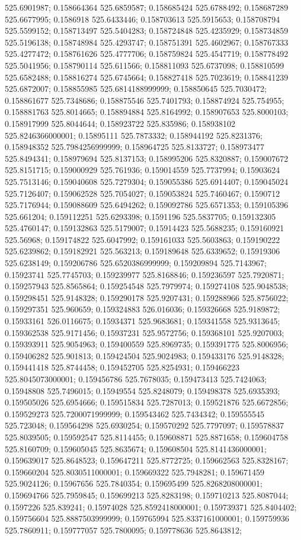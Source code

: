 525.6901987; 0.158664364 525.6859587; 0.158685424 525.6788492; 0.158687289 525.6677995; 0.1586918 525.6433446; 0.158703613 525.5915653; 0.158708794 525.5599152; 0.158713497 525.5404283; 0.158724848 525.4235929; 0.158734859 525.5196138; 0.158748984 525.4293747; 0.158751391 525.4602967; 0.158767333 525.4277472; 0.158761626 525.4777706; 0.158759824 525.4547719; 0.158778492 525.5041956; 0.158790114 525.611566; 0.158811093 525.6737098; 0.158810599 525.6582488; 0.158816274 525.6745664; 0.158827418 525.7023619; 0.158841239 525.6872007; 0.158855985 525.6814188999999; 0.158850645 525.7030472; 0.158861677 525.7348686; 0.158875546 525.7401793; 0.158874924 525.754955; 0.158881763 525.8014665; 0.158894884 525.8164992; 0.158907653 525.8000103; 0.158917999 525.8044644; 0.158923722 525.835986; 0.158938102 525.8246366000001; 0.15895111 525.7873332; 0.158944192 525.8231376; 0.158948352 525.7984256999999; 0.158964725 525.8133727; 0.158973477 525.8494341; 0.158979694 525.8137153; 0.158995206 525.8320887; 0.159007672 525.8151715; 0.159000929 525.761936; 0.159014559 525.7737994; 0.15903624 525.7513146; 0.159040608 525.7279304; 0.159055386 525.6914407; 0.159045024 525.7126407; 0.159062528 525.7054027; 0.159053824 525.7460467; 0.1590712 525.7176944; 0.159088609 525.6494262; 0.159092786 525.6571353; 0.159105396 525.661204; 0.159112251 525.6293398; 0.1591196 525.5837705; 0.159132305 525.4760147; 0.159132863 525.5179007; 0.15914423 525.5688235; 0.159160921 525.56968; 0.159174822 525.6047992; 0.159161033 525.5603863; 0.159190222 525.6239862; 0.159182921 525.563213; 0.159189648 525.6339652; 0.15919306 525.6238149; 0.159206786 525.6520386999999; 0.159209894 525.7143967; 0.15923741 525.7745703; 0.159239977 525.8168846; 0.159236597 525.7920871; 0.159257943 525.8565864; 0.159254548 525.7979974; 0.159274108 525.9048538; 0.159298451 525.9148328; 0.159290178 525.9207431; 0.159288966 525.8756022; 0.159297351 525.960659; 0.159324883 526.016036; 0.159326668 525.9189872; 0.15933161 526.0116675; 0.15934371 525.9683681; 0.159341558 525.9313645; 0.159362538 525.9171456; 0.15937231 525.9572756; 0.159368101 525.9207003; 0.159393911 525.9054963; 0.159400559 525.8969735; 0.159391775 525.8006956; 0.159406282 525.901813; 0.159424504 525.9024983; 0.159433176 525.9148328; 0.159441418 525.8744458; 0.159452705 525.8254931; 0.159466223 525.8045073000001; 0.159456786 525.7678035; 0.159473413 525.7424063; 0.15948808 525.7496015; 0.15949554 525.8248079; 0.159498378 525.6935393; 0.159505026 525.6954666; 0.159515834 525.7287013; 0.159521876 525.6672856; 0.159529273 525.7200071999999; 0.159543462 525.7434342; 0.159555545 525.723048; 0.159564298 525.6930254; 0.159570292 525.7797097; 0.159578837 525.8039505; 0.159592547 525.8114455; 0.159608871 525.8871658; 0.159604758 525.8160709; 0.159605045 525.8635674; 0.159608504 525.8141436000001; 0.159639017 525.8648523; 0.159647211 525.8772725; 0.159662563 525.8328167; 0.159660204 525.8030511000001; 0.159669322 525.7948281; 0.159671459 525.9024126; 0.15967656 525.7840354; 0.159695499 525.8268208000001; 0.159694766 525.7959845; 0.159699213 525.8283198; 0.159710213 525.8087044; 0.1597226 525.839241; 0.15974028 525.8592418000001; 0.159739371 525.8404402; 0.159756604 525.8887503999999; 0.159765994 525.8337161000001; 0.159759936 525.7860911; 0.159777057 525.7800095; 0.159778636 525.8643812; 
